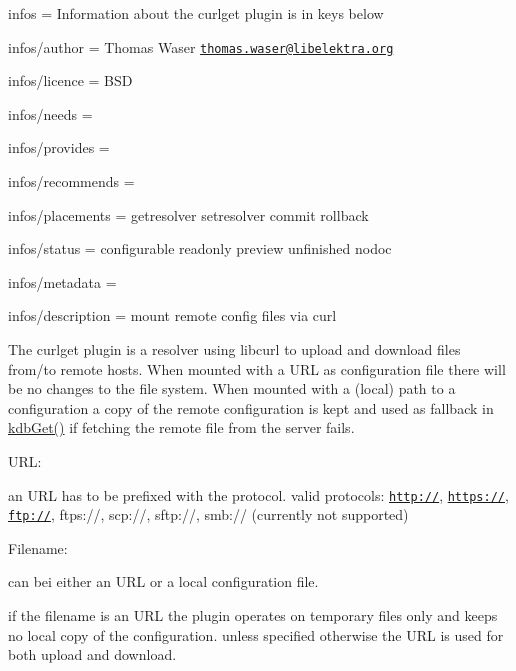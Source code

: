 
\begin{DoxyItemize}
\item infos = Information about the curlget plugin is in keys below
\item infos/author = Thomas Waser \href{mailto:thomas.waser@libelektra.org}{\tt thomas.\+waser@libelektra.\+org}
\item infos/licence = B\+SD
\item infos/needs =
\item infos/provides =
\item infos/recommends =
\item infos/placements = getresolver setresolver commit rollback
\item infos/status = configurable readonly preview unfinished nodoc
\item infos/metadata =
\item infos/description = mount remote config files via curl
\end{DoxyItemize}

The {\ttfamily curlget} plugin is a resolver using libcurl to upload and download files from/to remote hosts. When mounted with a {\ttfamily U\+RL} as configuration file there will be no changes to the file system. When mounted with a (local) path to a configuration a copy of the remote configuration is kept and used as fallback in {\ttfamily \hyperlink{group__kdb_ga28e385fd9cb7ccfe0b2f1ed2f62453a1}{kdb\+Get()}} if fetching the remote file from the server fails.

{\ttfamily U\+RL}\+:

an U\+RL has to be prefixed with the protocol. valid protocols\+: {\ttfamily \href{http://}{\tt http\+://}}, {\ttfamily \href{https://}{\tt https\+://}}, {\ttfamily \href{ftp://}{\tt ftp\+://}}, {\ttfamily ftps\+://}, {\ttfamily scp\+://}, {\ttfamily sftp\+://}, {\ttfamily smb\+://} (currently not supported)

{\ttfamily Filename}\+:

can bei either an {\ttfamily U\+RL} or a local configuration file.

if the filename is an {\ttfamily U\+RL} the plugin operates on temporary files only and keeps no local copy of the configuration. unless specified otherwise the {\ttfamily U\+RL} is used for both upload and download.


